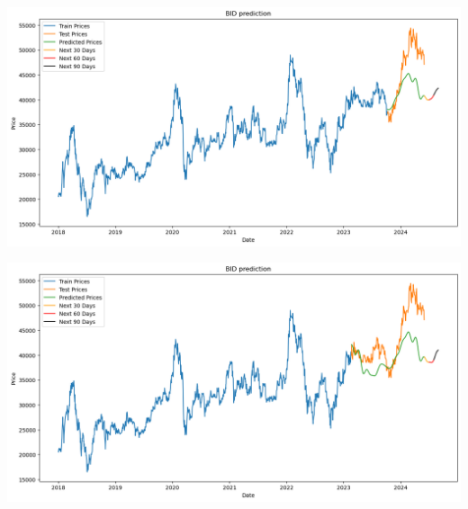 \documentclass[conference]{IEEEtran}
\begin{document}
\begin{minipage}{0.23\textwidth}
    \centering
    \includegraphics[width=\linewidth]{images/LR CalendarFourier, DeterministicProcess/LRCD_BIDV_91.png}
    \label{fig:image1}
\end{minipage}
\hfill
\begin{minipage}{0.23\textwidth}
    \centering
    \includegraphics[width=\linewidth]{images/LR CalendarFourier, DeterministicProcess/LRCD_BIDV_82.png}
    \label{fig:image2}
\end{minipage}
\end{document}
